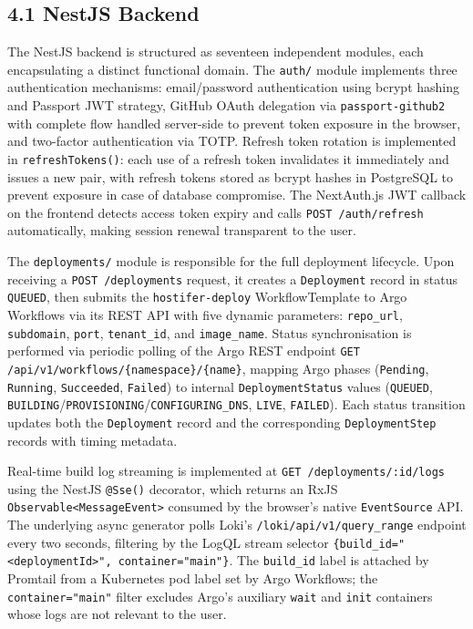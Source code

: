 \subsection*{4.1 NestJS Backend}

The NestJS backend is structured as seventeen independent modules, each encapsulating a distinct functional domain. The \texttt{auth/} module implements three authentication mechanisms: email/password authentication using bcrypt hashing and Passport JWT strategy, GitHub OAuth delegation via \texttt{passport-github2} with complete flow handled server-side to prevent token exposure in the browser, and two-factor authentication via TOTP. Refresh token rotation is implemented in \texttt{refreshTokens()}: each use of a refresh token invalidates it immediately and issues a new pair, with refresh tokens stored as bcrypt hashes in PostgreSQL to prevent exposure in case of database compromise. The NextAuth.js JWT callback on the frontend detects access token expiry and calls \texttt{POST /auth/refresh} automatically, making session renewal transparent to the user.

The \texttt{deployments/} module is responsible for the full deployment lifecycle. Upon receiving a \texttt{POST /deployments} request, it creates a \texttt{Deployment} record in status \texttt{QUEUED}, then submits the \texttt{hostifer-deploy} WorkflowTemplate to Argo Workflows via its REST API with five dynamic parameters: \texttt{repo\_url}, \texttt{subdomain}, \texttt{port}, \texttt{tenant\_id}, and \texttt{image\_name}. Status synchronisation is performed via periodic polling of the Argo REST endpoint \texttt{GET /api/v1/workflows/\{namespace\}/\{name\}}, mapping Argo phases (\texttt{Pending}, \texttt{Running}, \texttt{Succeeded}, \texttt{Failed}) to internal \texttt{DeploymentStatus} values (\texttt{QUEUED}, \texttt{BUILDING}/\texttt{PROVISIONING}/\texttt{CONFIGURING\_DNS}, \texttt{LIVE}, \texttt{FAILED}). Each status transition updates both the \texttt{Deployment} record and the corresponding \texttt{DeploymentStep} records with timing metadata.

Real-time build log streaming is implemented at \texttt{GET /deployments/:id/logs} using the NestJS \texttt{@Sse()} decorator, which returns an RxJS \texttt{Observable<MessageEvent>} consumed by the browser's native \texttt{EventSource} API. The underlying async generator polls Loki's \texttt{/loki/api/v1/query\_range} endpoint every two seconds, filtering by the LogQL stream selector \texttt{\{build\_id="<deploymentId>", container="main"\}}. The \texttt{build\_id} label is attached by Promtail from a Kubernetes pod label set by Argo Workflows; the \texttt{container="main"} filter excludes Argo's auxiliary \texttt{wait} and \texttt{init} containers whose logs are not relevant to the user.

